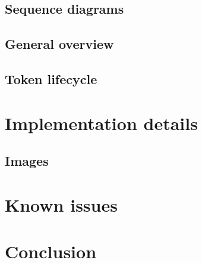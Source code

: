 \documentclass{bc}
\begin{document}

\subsection{Sequence diagrams}

\subsection{General overview}


\subsection{Token lifecycle}

\section{Implementation details}

\subsection{Images}

\section{Known issues}


\section{Conclusion}

\newpage
\printbibliography
\end{document}
